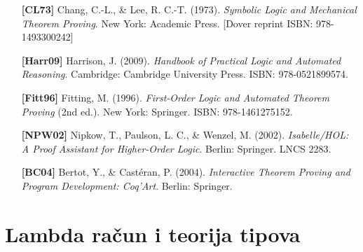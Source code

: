 \begin{itemize}[leftmargin=2cm, labelsep=0.5cm, itemsep=0.3cm]

\item[\textbf{[CL73]}] Chang, C.-L., \& Lee, R. C.-T. (1973). \textit{Symbolic Logic and Mechanical Theorem Proving}. New York: Academic Press. [Dover reprint ISBN: 978-1493300242]

\item[\textbf{[Harr09]}] Harrison, J. (2009). \textit{Handbook of Practical Logic and Automated Reasoning}. Cambridge: Cambridge University Press. ISBN: 978-0521899574.

\item[\textbf{[Fitt96]}] Fitting, M. (1996). \textit{First-Order Logic and Automated Theorem Proving} (2nd ed.). New York: Springer. ISBN: 978-1461275152.

\item[\textbf{[NPW02]}] Nipkow, T., Paulson, L. C., \& Wenzel, M. (2002). \textit{Isabelle/HOL: A Proof Assistant for Higher-Order Logic}. Berlin: Springer. LNCS 2283.

\item[\textbf{[BC04]}] Bertot, Y., \& Castéran, P. (2004). \textit{Interactive Theorem Proving and Program Development: Coq'Art}. Berlin: Springer.

\end{itemize}

\section{Lambda račun i teorija tipova}

